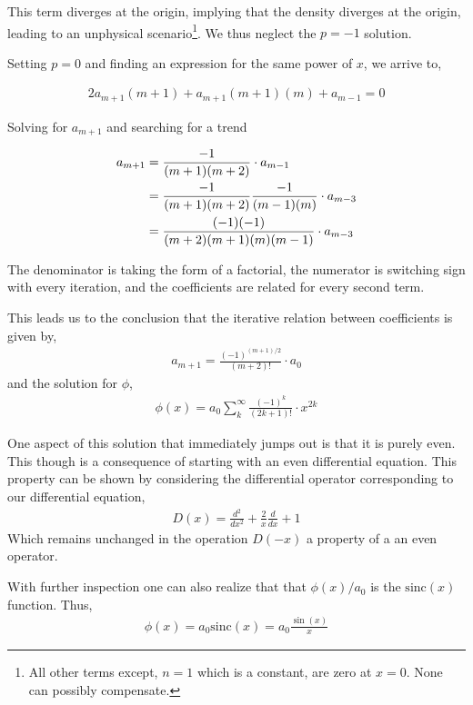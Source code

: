 \documentclass[12pt, manuscript]{article}
\begin{document}
This term diverges at the origin, implying that the density diverges at the origin, leading to an unphysical scenario\footnote{All other terms except, $n=1$ which is a constant, are zero at $x=0$. None can possibly compensate.}. We thus neglect the $p=-1$ solution.\par

Setting $p=0$ and finding an expression for the same power of $x$, we arrive to,
 
\begin{align}
2a_{m+1}(m+1)+a_{m+1}(m+1)(m)+a_{m-1}=0
\end{align}

Solving for $a_{m+1}$ and searching for a trend

\begin{align}
a_{m+1} &= \frac{-1}{(m+1)(m+2)}\cdot a_{m-1}\\
 &=\frac{-1}{(m+1)(m+2)}\frac{-1}{(m-1)(m)}\cdot a_{m-3}\notag\\
 &=\frac{(-1)( -1)}{(m+2)(m+1)(m)(m-1)}\cdot a_{m-3}\notag
\end{align}

The denominator is taking the form of a factorial, the numerator is switching sign with every iteration, and the coefficients are related for every second term. \par

This leads us to the conclusion that the iterative relation between coefficients is given by,
\begin{align}
a_{m+1} = \frac{(-1)^{(m+1)/2}}{(m+2)!}\cdot a_{0}
\end{align}
and the solution for $\phi$,
\begin{align}
\phi(x) = a_{0}\sum_{k}^{\infty}\frac{(-1)^{k}}{(2k+1)!}\cdot x^{2k}
\end{align}

One aspect of this solution that immediately jumps out is that it is purely even. This though is a consequence of starting with an even differential equation. This property can be shown by considering the differential operator corresponding to our differential equation,
\begin{align}
D(x) = \frac{d^{2}}{dx^{2}}+\frac{2}{x}\frac{d}{dx}+1
\end{align}
Which remains unchanged in the operation $D(-x)$ a property of a an even operator.

With further inspection one can also realize that that $\phi(x)/a_{0}$ is the $\text{sinc}(x)$ function. Thus,
\begin{align}
\phi(x) =a_{0}\text{sinc}(x) = a_{0}\frac{\sin(x)}{x}\label{eq:sinc}
\end{align}
\end{document}
